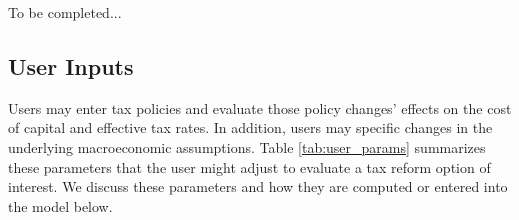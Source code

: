 \documentclass[article,11pt,letterpaper,fleqn]{article}
\theoremstyle{definition}
\numberwithin{equation}{section}
\begin{document}
To be completed...




\subsection{User Inputs}

Users may enter tax policies and evaluate those policy changes' effects on the cost of capital and effective tax rates.  In addition, users may specific changes in the underlying macroeconomic assumptions.  Table \ref{tab:user_params} summarizes these parameters that the user might adjust to evaluate a tax reform option of interest.  We discuss these parameters and how they are computed or entered into the model below.
\end{document}
